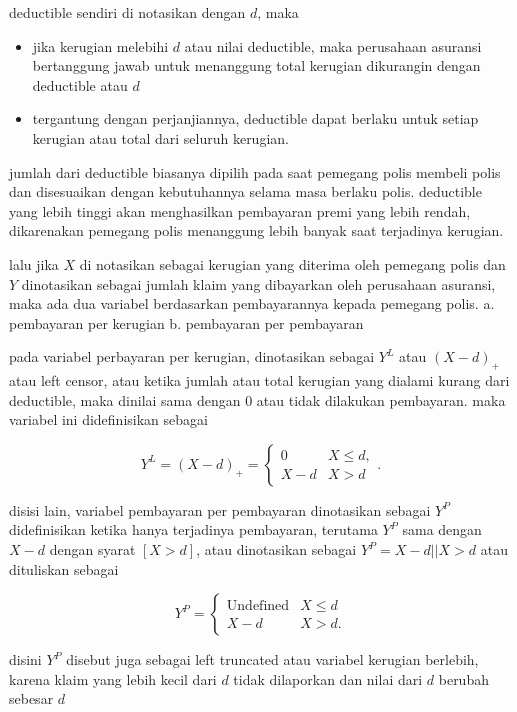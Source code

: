\documentclass[
]{book}
\begin{document}
deductible sendiri di notasikan dengan \(d\), maka

\begin{itemize}
\item
  jika kerugian melebihi \(d\) atau nilai deductible, maka perusahaan asuransi bertanggung jawab untuk menanggung total kerugian dikurangin dengan deductible atau \(d\)
\item
  tergantung dengan perjanjiannya, deductible dapat berlaku untuk setiap kerugian atau total dari seluruh kerugian.
\end{itemize}

jumlah dari deductible biasanya dipilih pada saat pemegang polis membeli polis dan disesuaikan dengan kebutuhannya selama masa berlaku polis. deductible yang lebih tinggi akan menghasilkan pembayaran premi yang lebih rendah, dikarenakan pemegang polis menanggung lebih banyak saat terjadinya kerugian.

lalu jika \(X\) di notasikan sebagai kerugian yang diterima oleh pemegang polis dan \(Y\) dinotasikan sebagai jumlah klaim yang dibayarkan oleh perusahaan asuransi, maka ada dua variabel berdasarkan pembayarannya kepada pemegang polis.
a. pembayaran per kerugian
b. pembayaran per pembayaran

pada variabel perbayaran per kerugian, dinotasikan sebagai \(Y^L\) atau \((X-d)_+\) atau left censor, atau ketika jumlah atau total kerugian yang dialami kurang dari deductible, maka dinilai sama dengan 0 atau tidak dilakukan pembayaran. maka variabel ini didefinisikan sebagai

\[
Y^{L} = \left( X - d \right)_{+} 
= \left\{ \begin{array}{cc}
0 & X \le d, \\
X - d & X > d  
\end{array} \right. .
\]

disisi lain, variabel pembayaran per pembayaran dinotasikan sebagai \(Y^P\) didefinisikan ketika hanya terjadinya pembayaran, terutama \(Y^P\) sama dengan \(X-d\) dengan syarat \([X>d]\), atau dinotasikan sebagai \(Y^P=X-d||X>d\) atau dituliskan sebagai

\[
Y^{P} = \left\{ \begin{matrix}
\text{Undefined} & X \le d \\
X - d & X > d .
\end{matrix}  \right.
\]

disini \(Y^P\) disebut juga sebagai left truncated atau variabel kerugian berlebih, karena klaim yang lebih kecil dari \(d\) tidak dilaporkan dan nilai dari \(d\) berubah sebesar \(d\)
\end{document}
